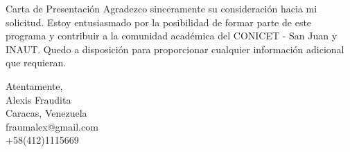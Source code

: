 \documentclass{letter} %
\begin{document}
\begin{rSection}{Carta de Presentación}
Agradezco sinceramente su consideración hacia mi solicitud. Estoy entusiasmado por la posibilidad de formar parte de este programa y contribuir a la comunidad académica del CONICET - San Juan y INAUT. Quedo a disposición para proporcionar cualquier información adicional que requieran.\\

\vspace{1cm}

Atentamente, \\
Alexis Fraudita \\
Caracas, Venezuela \\
fraumalex@gmail.com \\
+58(412)1115669

\end{rSection}
\end{document}
